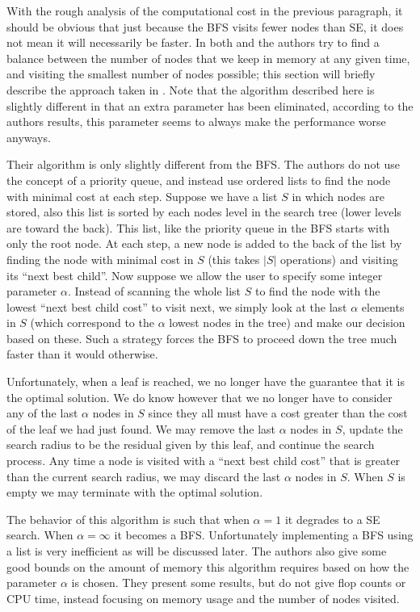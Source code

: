 \documentclass[12pt,Bold,letterpaper]{mcgilletdclass}
\begin{document}
With the rough analysis of the computational cost in the previous paragraph, it should be obvious that just because the BFS visits fewer nodes than SE, it does not mean it will necessarily be faster. In both \cite{DaiY08} and \cite{StuBF07} the authors try to find a balance between the number of nodes that we keep in memory at any given time, and visiting the smallest number of nodes possible; this section will briefly describe the approach taken in \cite{StuBF07}. Note that the algorithm described here is slightly different in that an extra parameter has been eliminated, according to the authors results, this parameter seems to always make the performance worse anyways.

Their algorithm is only slightly different from the BFS. The authors do not use the concept of a priority queue, and instead use ordered lists to find the node with minimal cost at each step. Suppose we have a list $S$ in which nodes are stored, also this list is sorted by each nodes level in the search tree (lower levels are toward the back). This list, like the priority queue in the BFS starts with only the root node. At each step, a new node is added to the back of the list by finding the node with minimal cost in $S$ (this takes $|S|$ operations) and visiting its ``next best child''. Now suppose we allow the user to specify some integer parameter $\alpha$. Instead of scanning the whole list $S$ to find the node with the lowest ``next best child cost'' to visit next, we simply look at the last $\alpha$ elements in $S$ (which correspond to the $\alpha$ lowest nodes in the tree) and make our decision based on these. Such a strategy forces the BFS to proceed down the tree much faster than it would otherwise.

Unfortunately, when a leaf is reached, we no longer have the guarantee that it is the optimal solution. We do know however that we no longer have to consider any of the last $\alpha$ nodes in $S$ since they all must have a cost greater than the cost of the leaf we had just found. We may remove the last $\alpha$ nodes in $S$, update the search radius to be the residual given by this leaf, and continue the search process. Any time a node is visited with a ``next best child cost'' that is greater than the current search radius, we may discard the last $\alpha$ nodes in $S$. When $S$ is empty we may terminate with the optimal solution.

The behavior of this algorithm is such that when $\alpha = 1$ it degrades to a SE search. When $\alpha = \infty$ it becomes a BFS. Unfortunately implementing a BFS using a list is very inefficient as will be discussed later. The authors also give some good bounds on the amount of memory this algorithm requires based on how the parameter $\alpha$ is chosen. They present some results, but do not give flop counts or CPU time, instead focusing on memory usage and the number of nodes visited.
\end{document}
